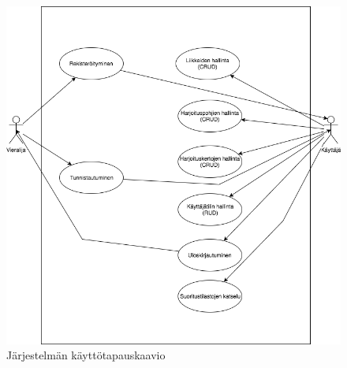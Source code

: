 \documentclass{article}
\begin{document}
\begin{figure}
  \includegraphics[width=\textwidth]{kayttotapauskaavio.png}
  \caption{Järjestelmän käyttötapauskaavio}
  \label{fig:usecases}
\end{figure}
\end{document}
